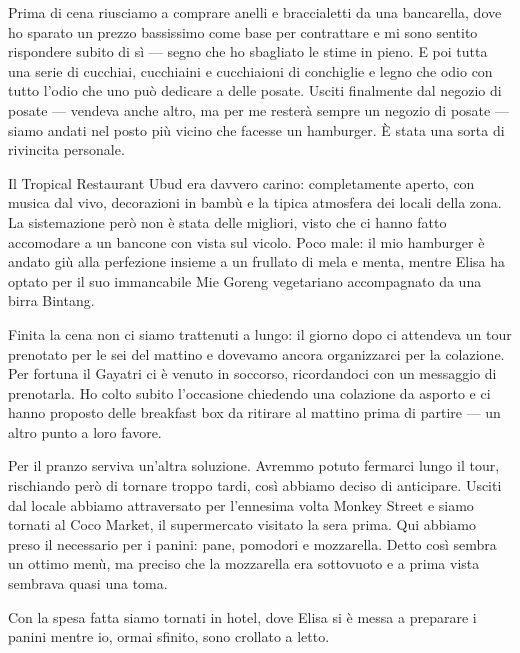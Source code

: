 Prima di cena riusciamo a comprare anelli e braccialetti da una bancarella, dove ho sparato un prezzo bassissimo come base per contrattare e mi sono sentito rispondere subito di sì — segno che ho sbagliato le stime in pieno. E poi tutta una serie di cucchiai, cucchiaini e cucchiaioni di conchiglie e legno che odio con tutto l'odio che uno può dedicare a delle posate. Usciti finalmente dal negozio di posate — vendeva anche altro, ma per me resterà sempre un negozio di posate — siamo andati nel posto più vicino che facesse un hamburger. È stata una sorta di rivincita personale.

Il Tropical Restaurant Ubud era davvero carino: completamente aperto, con musica dal vivo, decorazioni in bambù e la tipica atmosfera dei locali della zona. La sistemazione però non è stata delle migliori, visto che ci hanno fatto accomodare a un bancone con vista sul vicolo. Poco male: il mio hamburger è andato giù alla perfezione insieme a un frullato di mela e menta, mentre Elisa ha optato per il suo immancabile Mie Goreng vegetariano accompagnato da una birra Bintang.

Finita la cena non ci siamo trattenuti a lungo: il giorno dopo ci attendeva un tour prenotato per le sei del mattino e dovevamo ancora organizzarci per la colazione. Per fortuna il Gayatri ci è venuto in soccorso, ricordandoci con un messaggio di prenotarla. Ho colto subito l'occasione chiedendo una colazione da asporto e ci hanno proposto delle breakfast box da ritirare al mattino prima di partire — un altro punto a loro favore.

Per il pranzo serviva un'altra soluzione. Avremmo potuto fermarci lungo il tour, rischiando però di tornare troppo tardi, così abbiamo deciso di anticipare. Usciti dal locale abbiamo attraversato per l'ennesima volta Monkey Street e siamo tornati al Coco Market, il supermercato visitato la sera prima. Qui abbiamo preso il necessario per i panini: pane, pomodori e mozzarella. Detto così sembra un ottimo menù, ma preciso che la mozzarella era sottovuoto e a prima vista sembrava quasi una toma.

Con la spesa fatta siamo tornati in hotel, dove Elisa si è messa a preparare i panini mentre io, ormai sfinito, sono crollato a letto.


\pagestyle{empty} %


%

